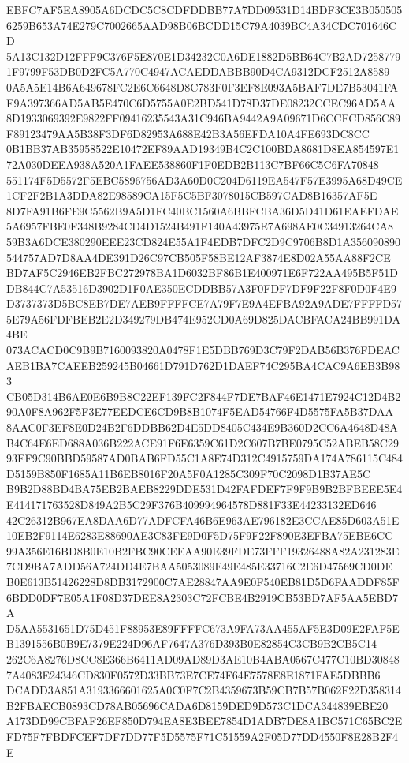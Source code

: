 \documentclass[UTF8,fontset=fandol,zihao=-4,a4paper]{ctexart}
\begin{document}
{{EBFC7AF5EA8905A6DCDC5C8CDFDDBB77A7DD09531D14BDF3CE3B0505056259B653A74E279C7002665AAD98B06BCDD15C79A4039BC4A34CDC701646CD
5A13C132D12FFF9C376F5E870E1D34232C0A6DE1882D5BB64C7B2AD72587791F9799F53DB0D2FC5A770C4947ACAEDDABBB90D4CA9312DCF2512A8589
0A5A5E14B6A649678FC2E6C6648D8C783F0F3EF8E093A5BAF7DE7B53041FAE9A397366AD5AB5E470C6D5755A0E2BD541D78D37DE08232CCEC96AD5AA
8D1933069392E9822FF09416235543A31C946BA9442A9A09671D6CCFCD856C89F89123479AA5B38F3DF6D82953A688E42B3A56EFDA10A4FE693DC8CC
0B1BB37AB35958522E10472EF89AAD19349B4C2C100BDA8681D8EA854597E172A030DEEA938A520A1FAEE538860F1F0EDB2B113C7BF66C5C6FA70848
551174F5D5572F5EBC5896756AD3A60D0C204D6119EA547F57E3995A68D49CE1CF2F2B1A3DDA82E98589CA15F5C5BF3078015CB597CAD8B16357AF5E
8D7FA91B6FE9C5562B9A5D1FC40BC1560A6BBFCBA36D5D41D61EAEFDAE5A6957FBE0F348B9284CD4D1524B491F140A43975E7A698AE0C34913264CA8
59B3A6DCE380290EEE23CD824E55A1F4EDB7DFC2D9C9706B8D1A356090890544757AD7D8AA4DE391D26C97CB505F58BE12AF3874E8D02A55AA88F2CE
BD7AF5C2946EB2FBC272978BA1D6032BF86B1E400971E6F722AA495B5F51DDB844C7A53516D3902D1F0AE350ECDDBB57A3F0FDF7DF9F22F8F0D0F4E9
D3737373D5BC8EB7DE7AEB9FFFFCE7A79F7E9A4EFBA92A9ADE7FFFFD575E79A56FDFBEB2E2D349279DB474E952CD0A69D825DACBFACA24BB991DA4BE
073ACACD0C9B9B7160093820A0478F1E5DBB769D3C79F2DAB56B376FDEACAEB1BA7CAEEB259245B04661D791D762D1DAEF74C295BA4CAC9A6EB3B983
CB05D314B6AE0E6B9B8C22EF139FC2F844F7DE7BAF46E1471E7924C12D4B290A0F8A962F5F3E77EEDCE6CD9B8B1074F5EAD54766F4D5575FA5B37DAA
8AAC0F3EF8E0D24B2F6DDBB62D4E5DD8405C434E9B360D2CC6A4648D48AB4C64E6ED688A036B222ACE91F6E6359C61D2C607B7BE0795C52ABEB58C29
93EF9C90BBD59587AD0BAB6FD55C1A8E74D312C4915759DA174A786115C484D5159B850F1685A11B6EB8016F20A5F0A1285C309F70C2098D1B37AE5C
B9B2D88BD4BA75EB2BAEB8229DDE531D42FAFDEF7F9F9B9B2BFBEEE5E4E414171763528D849A2B5C29F376B409994964578D881F33E44233132ED646
42C26312B967EA8DAA6D77ADFCFA46B6E963AE796182E3CCAE85D603A51E10EB2F9114E6283E88690AE3C83FE9D0F5D75F9F22F890E3EFBA75EBE6CC
99A356E16BD8B0E10B2FBC90CEEAA90E39FDE73FFF19326488A82A231283E7CD9BA7ADD56A724DD4E7BAA5053089F49E485E33716C2E6D47569CD0DE
B0E613B51426228D8DB3172900C7AE28847AA9E0F540EB81D5D6FAADDF85F6BDD0DF7E05A1F08D37DEE8A2303C72FCBE4B2919CB53BD7AF5AA5EBD7A
D5AA5531651D75D451F88953E89FFFFC673A9FA73AA455AF5E3D09E2FAF5EB1391556B0B9E7379E224D96AF7647A376D393B0E82854C3CB9B2CB5C14
262C6A8276D8CC8E366B6411AD09AD89D3AE10B4ABA0567C477C10BD308487A4083E24346CD830F0572D33BB73E7CE74F64E7578E8E1871FAE5DBBB6
DCADD3A851A3193366601625A0C0F7C2B4359673B59CB7B57B062F22D358314B2FBAECB0893CD78AB05696CADA6D8159DED9D573C1DCA344839EBE20
A173DD99CBFAF26EF850D794EA8E3BEE7854D1ADB7DE8A1BC571C65BC2EFD75F7FBDFCEF7DF7DD77F5D5575F71C51559A2F05D77DD4550F8E28B2F4E
}}
\end{document}
